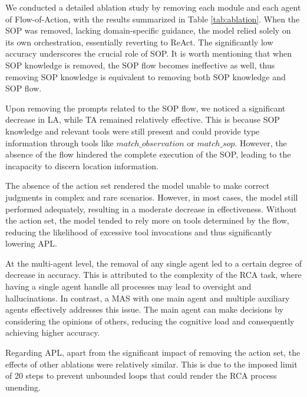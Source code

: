 We conducted a detailed ablation study by removing each module and each agent of Flow-of-Action, with the results summarized in Table \ref{tab:ablation}. When the SOP was removed, lacking domain-specific guidance, the model relied solely on its own orchestration, essentially reverting to ReAct. The significantly low accuracy underscores the crucial role of SOP. It is worth mentioning that when SOP knowledge is removed, the SOP flow becomes ineffective as well, thus removing SOP knowledge is equivalent to removing both SOP knowledge and SOP flow.

Upon removing the prompts related to the SOP flow, we noticed a significant decrease in LA, while TA remained relatively effective. This is because SOP knowledge and relevant tools were still present and could provide type information through tools like $match\_observation$ or $match\_sop$. However, the absence of the flow hindered the complete execution of the SOP, leading to the incapacity to discern location information.

The absence of the action set rendered the model unable to make correct judgments in complex and rare scenarios. However, in most cases, the model still performed adequately, resulting in a moderate decrease in effectiveness. Without the action set, the model tended to rely more on tools determined by the flow, reducing the likelihood of excessive tool invocations and thus significantly lowering APL.

At the multi-agent level, the removal of any single agent led to a certain degree of decrease in accuracy. This is attributed to the complexity of the RCA task, where having a single agent handle all processes may lead to oversight and hallucinations. In contrast, a MAS with one main agent and multiple auxiliary agents effectively addresses this issue. The main agent can make decisions by considering the opinions of others, reducing the cognitive load and consequently achieving higher accuracy.

Regarding APL, apart from the significant impact of removing the action set, the effects of other ablations were relatively similar. This is due to the imposed limit of 20 steps to prevent unbounded loops that could render the RCA process unending.




